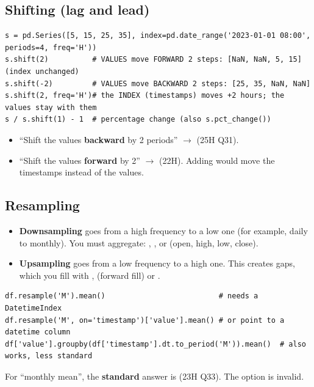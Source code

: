 \subsection{Shifting (lag and lead)}
\begin{codebox}
\begin{Verbatim}
s = pd.Series([5, 15, 25, 35], index=pd.date_range('2023-01-01 08:00', periods=4, freq='H'))
s.shift(2)          # VALUES move FORWARD 2 steps: [NaN, NaN, 5, 15]   (index unchanged)
s.shift(-2)         # VALUES move BACKWARD 2 steps: [25, 35, NaN, NaN]
s.shift(2, freq='H')# the INDEX (timestamps) moves +2 hours; the values stay with them
s / s.shift(1) - 1  # percentage change (also s.pct_change())
\end{Verbatim}
\end{codebox}
\begin{exam}
\begin{itemize}
  \item ``Shift the values \textbf{backward} by 2 periods'' $\to$  (25H Q31).
  \item ``Shift the values \textbf{forward} by 2'' $\to$  (22H). Adding  would move the timestamps instead of the values.
\end{itemize}
\end{exam}

\subsection{Resampling}
\begin{itemize}
  \item \textbf{Downsampling} goes from a high frequency to a low one (for example, daily to monthly). You must aggregate: , , or  (open, high, low, close).
  \item \textbf{Upsampling} goes from a low frequency to a high one. This creates gaps, which you fill with ,  (forward fill) or .
\end{itemize}
\begin{codebox}
\begin{Verbatim}
df.resample('M').mean()                          # needs a DatetimeIndex
df.resample('M', on='timestamp')['value'].mean() # or point to a datetime column
df['value'].groupby(df['timestamp'].dt.to_period('M')).mean()  # also works, less standard
\end{Verbatim}
\end{codebox}
For ``monthly mean'', the \textbf{standard} answer is  (23H Q33).
The option  is invalid.

